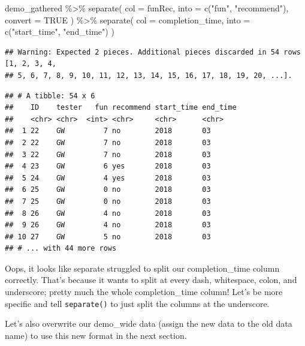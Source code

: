 \documentclass[
]{book}
\newenvironment{Shaded}{\begin{snugshade}}{\end{snugshade}}
\newcommand{\AttributeTok}[1]{\textcolor[rgb]{0.77,0.63,0.00}{#1}}
\newcommand{\ConstantTok}[1]{\textcolor[rgb]{0.00,0.00,0.00}{#1}}
\newcommand{\FunctionTok}[1]{\textcolor[rgb]{0.00,0.00,0.00}{#1}}
\newcommand{\NormalTok}[1]{#1}
\newcommand{\SpecialCharTok}[1]{\textcolor[rgb]{0.00,0.00,0.00}{#1}}
\newcommand{\StringTok}[1]{\textcolor[rgb]{0.31,0.60,0.02}{#1}}
\begin{document}
\begin{Shaded}
\begin{Highlighting}[]
\NormalTok{demo\_gathered }\SpecialCharTok{\%\textgreater{}\%}
  \FunctionTok{separate}\NormalTok{(}
    \AttributeTok{col =}\NormalTok{ funRec,}
    \AttributeTok{into =} \FunctionTok{c}\NormalTok{(}\StringTok{"fun"}\NormalTok{, }\StringTok{"recommend"}\NormalTok{),}
    \AttributeTok{convert =} \ConstantTok{TRUE}
\NormalTok{    ) }\SpecialCharTok{\%\textgreater{}\%}
  \FunctionTok{separate}\NormalTok{(}
    \AttributeTok{col =}\NormalTok{ completion\_time,}
    \AttributeTok{into =} \FunctionTok{c}\NormalTok{(}\StringTok{"start\_time"}\NormalTok{, }\StringTok{"end\_time"}\NormalTok{)}
\NormalTok{    )}
\end{Highlighting}
\end{Shaded}

\begin{verbatim}
## Warning: Expected 2 pieces. Additional pieces discarded in 54 rows [1, 2, 3, 4,
## 5, 6, 7, 8, 9, 10, 11, 12, 13, 14, 15, 16, 17, 18, 19, 20, ...].
\end{verbatim}

\begin{verbatim}
## # A tibble: 54 x 6
##    ID    tester   fun recommend start_time end_time
##    <chr> <chr>  <int> <chr>     <chr>      <chr>   
##  1 22    GW         7 no        2018       03      
##  2 22    GW         7 no        2018       03      
##  3 22    GW         7 no        2018       03      
##  4 23    GW         6 yes       2018       03      
##  5 24    GW         4 yes       2018       03      
##  6 25    GW         0 no        2018       03      
##  7 25    GW         0 no        2018       03      
##  8 26    GW         4 no        2018       03      
##  9 26    GW         4 no        2018       03      
## 10 27    GW         5 no        2018       03      
## # ... with 44 more rows
\end{verbatim}

Oops, it looks like separate struggled to split our completion\_time column correctly. That's because it wants to split at every dash, whitespace, colon, and underscore; pretty much the whole completion\_time column! Let's be more specific and tell \texttt{separate()} to just split the columns at the underscore.

Let's also overwrite our demo\_wide data (assign the new data to the old data name) to use this new format in the next section.
\end{document}
